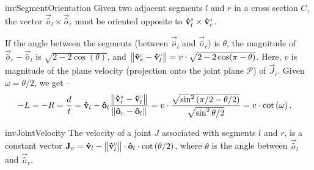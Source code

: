 \begin{restatable}{inv}{SegmentOrientation}
\label{inv:SegmentOrientation}
Given two adjacent segments $l$ and $r$ in a cross section $C$, the vector
$\vec{\hat o}_l\times \vec{\hat o}_r$ must be oriented opposite to $\vec{\hat v}_l^\shortparallel\times \vec{\hat v}_r^\shortparallel$.
\end{restatable}

If the angle between the segments (between $\vec{\hat o}_l$ and $\vec{\hat o}_r$) is $\theta$,
the magnitude of $\vec{\hat o}_r-\vec{\hat o}_l$ is $\sqrt{2-2\cos(\theta)}$,
and $ \left\| \vec{\hat v}_r^\shortparallel-\vec{\hat v}_l^\shortparallel\right\| = v\cdot\sqrt{2-2\cos(\pi-\theta)}$.
Here, $v$ is magnitude of the plane velocity (projection onto the joint plane
$\mathcal P$) of $\vec J_i$.
Given $\omega = \theta/2$, we get --
\begin{align*}
-L = -R &= \frac dt = \vec{\hat v}_l - \vec{\hat o}_l\frac{ \left\| \vec{\hat v}_r^\shortparallel
- \vec{\hat v}_l^\shortparallel\right\|}{ \left\| \vec{\hat o}_r-\vec{\hat o}_l\right\|}
= v\cdot\frac{\sqrt{\sin^2\left( {\pi/2-\theta/2}\right)}}{\sqrt{\sin^2{\theta/2}}}
= v\cdot\cot\left( \omega \right).
\end{align*}

\begin{restatable}{inv}{JointVelocity}
\label{inv:joint_velocity}
The velocity of a joint $J$ associated with segments $l$ and $r$, is a constant vector
$\vec J_v
= \vec{\hat v}_l - \left\| \vec{\hat v}_l^\shortparallel\right\|\cdot\vec{\hat o}_l\cdot\cot\left( \theta/2 \right)$,
where $\theta$ is the angle between $\vec{\hat o}_l$ and $\vec{\hat o}_r$.
\end{restatable}

